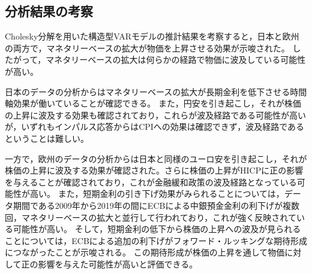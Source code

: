 \documentclass[12pt]{jarticle}
\begin{document}
{%



\newpage

\subsection{分析結果の考察}

Cholesky分解を用いた構造型VARモデルの推計結果を考察すると，日本と欧州の両方で，マネタリーベースの拡大が物価を上昇させる効果が示唆された。
したがって，マネタリーベースの拡大は何らかの経路で物価に波及している可能性が高い。

日本のデータの分析からはマネタリーベースの拡大が長期金利を低下させる時間軸効果が働いていることが確認できる。
また，円安を引き起こし，それが株価の上昇に波及する効果も確認されており，これらが波及経路である可能性が高いが，いずれもインパルス応答からはCPIへの効果は確認できず，波及経路であるということは難しい。

一方で，欧州のデータの分析からは日本と同様のユーロ安を引き起こし，それが株価の上昇に波及する効果が確認された。さらに株価の上昇がHICPに正の影響を与えることが確認されており，これが金融緩和政策の波及経路となっている可能性が高い。
また，短期金利の引き下げ効果がみられることについては，データ期間である2009年から2019年の間にECBによる中銀預金金利の利下げが複数回，マネタリーベースの拡大と並行して行われており，これが強く反映されている可能性が高い。
そして，短期金利の低下から株価の上昇への波及が見られることについては，ECBによる追加の利下げがフォワード・ルッキングな期待形成につながったことが示唆される。
この期待形成が株価の上昇を通して物価に対して正の影響を与えた可能性が高いと評価できる。

}
\end{document}
